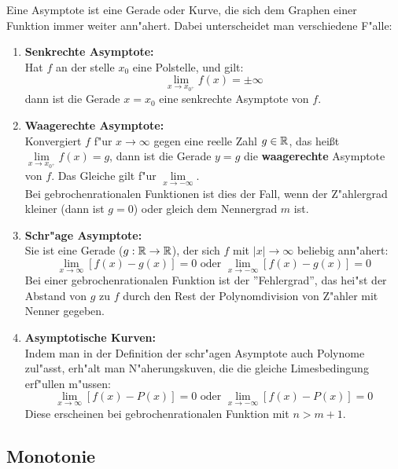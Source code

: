 Eine Asymptote ist eine Gerade oder Kurve, die sich dem Graphen einer Funktion immer weiter ann"ahert. Dabei unterscheidet man verschiedene F"alle:\\
\begin{Definition}
\begin{enumerate}
	\item \textbf{Senkrechte Asymptote:}\\
	Hat $f$ an der stelle $x_{0}$ eine Polstelle, und gilt:
		$$\lim\limits_{x \rightarrow x_{0^{+}}} f(x) = \pm \infty$$
	dann ist die Gerade $x=x_{0}$ eine senkrechte Asymptote von $f$.

	\item \textbf{Waagerechte Asymptote:}\\
	Konvergiert $f$ f"ur $x\rightarrow \infty$ gegen eine reelle Zahl $g\in \mathbb{R}$, das heißt $\lim\limits_{x \rightarrow x_{0^{+}}}{f(x)}=g$, dann ist die Gerade $y=g$ die \textbf{waagerechte} Asymptote von $f$. Das Gleiche gilt f"ur $\lim\limits_{x \rightarrow -\infty}$.\\
	Bei gebrochenrationalen Funktionen ist dies der Fall, wenn der Z"ahlergrad kleiner (dann ist $g=0$) oder gleich dem Nennergrad $m$ ist.

	\item \textbf{Schr"age Asymptote:}\\
	Sie ist eine Gerade ($g:\mathbb{R} \rightarrow \mathbb{R}$), der sich $f$ mit $|x|\rightarrow \infty$ beliebig ann"ahert:
	$$\lim\limits_{x \rightarrow \infty}{[f(x)-g(x)]}=0 \text{ oder } \lim\limits_{x \rightarrow -\infty}{[f(x)-g(x)]}=0$$
	Bei einer gebrochenrationalen Funktion ist der ''Fehlergrad'', das hei"st der Abstand von $g$ zu $f$ durch den Rest der Polynomdivision von Z"ahler mit Nenner gegeben.

	\item \textbf{Asymptotische Kurven:}\\
	Indem man in der Definition der schr"agen Asymptote auch Polynome zul"asst, erh"alt man N"aherungskuven, die die gleiche Limesbedingung erf"ullen m"ussen:
	$$\lim\limits_{x \rightarrow \infty}{[f(x)-P(x)]}=0 \text{ oder } \lim\limits_{x \rightarrow -\infty}{[f(x)-P(x)]}=0$$
	Diese erscheinen bei gebrochenrationalen Funktion mit $n>m+1$.
\end{enumerate}
\end{Definition}

\subsection{Monotonie}

